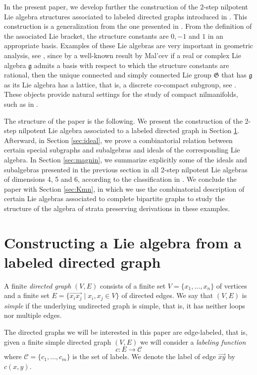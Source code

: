 \documentclass[12pt]{amsart}
\begin{document}
In the present paper, we develop further the construction of the 2-step nilpotent Lie algebra structures associated to labeled directed graphs introduced in \cite{CMS}. This construction is a generalization from the one presented in \cite{mainkar1}. From the definition of the associated Lie bracket, the structure constants are $0,-1$ and $1$ in an appropriate basis. Examples of these Lie algebras are very important in geometric analysis, see \cite{CD,markina}, since by a well-known result by Mal'cev if a real or complex Lie algebra ${\mathfrak g}$ admits a basis with respect to which the structure constants are rational, then the unique connected and simply connected Lie group ${\mathfrak G}$ that has ${\mathfrak g}$ as its Lie algebra has a lattice, that is, a discrete co-compact subgroup, see \cite{CG,malcev}. These objects provide natural settings for the study of compact nilmanifolds, such as in \cite{bauer}.

The structure of the paper is the following. We present the construction of the 2-step nilpotent Lie algebra associated to a labeled directed graph in Section \ref{sec:const}. Afterward, in Section \ref{sec:ideal}, we prove a combinatorial relation between certain special subgraphs and subalgebras and ideals of the corresponding Lie algebra. In Section \ref{sec:magnin}, we summarize explicitly some of the ideals and subalgebras presented in the previous section in all 2-step nilpotent Lie algebras of dimensions 4, 5 and 6, according to the classification in \cite{magnin}. We conclude the paper with Section \ref{sec:Kmn}, in which we use the combinatorial description of certain Lie algebras associated to complete bipartite graphs to study the structure of the algebra of strata preserving derivations in these examples.



\section{Constructing a Lie algebra from a labeled directed graph}\label{sec:const}

\noindent A finite {\it directed graph} $(V,E)$ consists of a finite set $V=\{x_1,\dotsc,x_n\}$ of vertices and a finite set $E=\{\overrightarrow{x_ix_j}\mid x_i,x_j\in V\}$ of directed edges. We say that $(V,E)$ is {\it simple} if the underlying undirected graph is simple, that is, it has neither loops nor multiple edges.

\noindent The directed graphs we will be interested in this paper are edge-labeled, that is, given a finite simple directed graph $(V,E)$ we will consider a \emph{labeling function}
\[
c\colon E\to \mathcal{C}
\]
where $\mathcal{C}=\{c_1,\dots,c_m\}$ is the set of labels. We denote the label of edge $\overrightarrow{xy}$ by $c(x,y)$.
\end{document}
